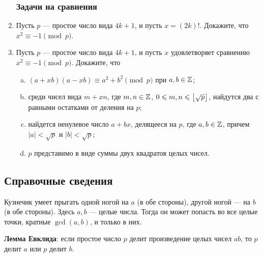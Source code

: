 \begin{enumerate}
\subsubsection*{Задачи на сравнения}

\item Пусть $p$ --- простое число вида $4k+1$, и пусть $x=(2k)!$. Докажите, что $x^2\equiv -1\pmod p$.
\item Пусть $p$ --- простое число вида $4k+1$, и пусть $x$ удовлетворяет сравнению $x^2\equiv -1\pmod p$. Докажите, что
\begin{enumerate}[a)]
\item $(a+xb)(a-xb) \equiv a^2+b^2 \pmod p$ при $a,b\in\mathbb Z$;
\item среди чисел вида $m+xn$, где $m,n\in\mathbb Z$, $0\leqslant m,n\leqslant\left\lfloor\sqrt p\right\rfloor$, найдутся два с равными остатками от деления на $p$;
\item найдется ненулевое число $a+bx$, делящееся на $p$, где $a,b\in\mathbb Z$, причем $|a|<\sqrt p$ и $|b|<\sqrt p$;
\item $p$ представимо в виде суммы двух квадратов целых чисел.
\end{enumerate}

\end{enumerate}

\subsection*{Справочные сведения}

Кузнечик умеет прыгать одной ногой на $a$ (в обе стороны), другой ногой --- на $b$ (в обе стороны). Здесь $a,b$ --- целые числа. Тогда он может попасть во все целые точки, кратные $\gcd(a,b)$, и только в них.

\textbf{Лемма Евклида}: если простое число $p$ делит произведение целых чисел $ab$, то $p$ делит $a$ или $p$ делит $b$.

